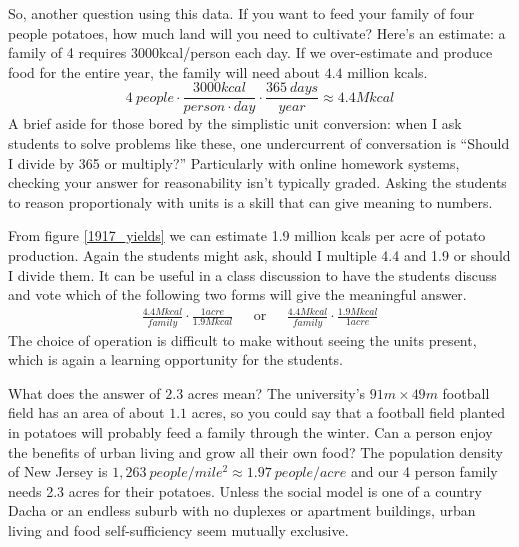 \documentclass[12pt]{iopart}
\newcommand{\be}{\begin{equation}}
\newcommand{\ee}{\end{equation}}
\newcommand{\bea}{\begin{eqnarray}}
\newcommand{\eea}{\end{eqnarray}}
\begin{document}
So, another question using this data.  If you want to feed your family of four people potatoes, how much land will you need to cultivate?
Here's an estimate: a family of 4 requires 3000kcal/person each day\cite{calorie_age}.  If we over-estimate and produce food for the entire year, the family will need about $4.4$ million kcals.
\be
4~people\cdot\frac{3000kcal}{person\cdot day}\cdot\frac{365~days}{year} \approx 4.4 M kcal 
\ee
A brief aside for those bored by the simplistic unit conversion: when I ask students to solve problems like these, one undercurrent of conversation is ``Should I divide by 365 or multiply?''  Particularly with online homework systems, checking your answer for reasonability isn't  typically graded. Asking the students to reason proportionaly with units is a skill that can give meaning to numbers. 

From figure \ref{1917_yields} we can estimate 1.9 million kcals per acre of potato production.  Again the students might ask, should I multiple 4.4 and 1.9 or should I divide them.  It can be useful in a class discussion to have the students discuss and vote which of the following two forms will give the meaningful answer.
\bea
\frac{4.4 M kcal}{family}\cdot\frac{1 acre}{1.9M kcal}  & \textrm{~~or~~}&
\frac{4.4 M kcal}{family}\cdot\frac{1.9M kcal}{1 acre}
\eea
The choice of operation is difficult to make without seeing the units present, which is again a learning opportunity for the students.

What does the answer of $2.3$ acres mean?  The university's $91m\times49m$ football field has an area of about $1.1$ acres, so you could say that a football field planted in potatoes will probably feed a family through the winter.  Can a person enjoy the benefits of urban living and grow all their own food?  The population density of New Jersey is $1,263~people/mile^2 \approx1.97~people/acre$ and our 4 person family needs 2.3 acres for their potatoes.  
Unless the social model is one of a country Dacha or an endless suburb with no duplexes or apartment buildings, urban living and food self-sufficiency seem mutually exclusive.
\end{document}
